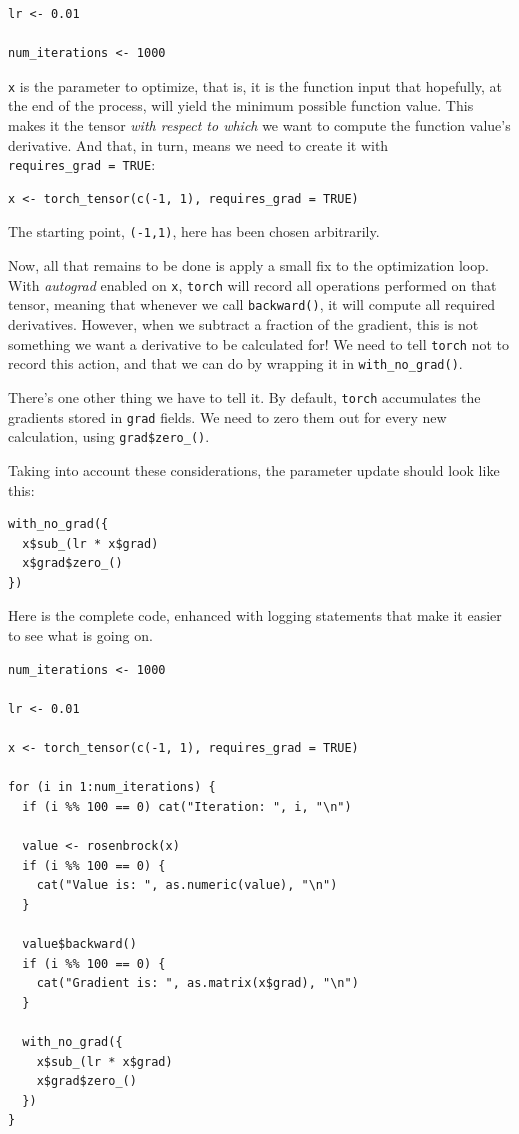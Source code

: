 \documentclass[
  letterpaper,
]{krantz}
\begin{document}
\begin{verbatim}
lr <- 0.01

num_iterations <- 1000
\end{verbatim}

\texttt{x} is the parameter to optimize, that is, it is the function
input that hopefully, at the end of the process, will yield the minimum
possible function value. This makes it the tensor \emph{with respect to
which} we want to compute the function value's derivative. And that, in
turn, means we need to create it with \texttt{requires\_grad\ =\ TRUE}:

\begin{verbatim}
x <- torch_tensor(c(-1, 1), requires_grad = TRUE)
\end{verbatim}

The starting point, \texttt{(-1,1)}, here has been chosen arbitrarily.

Now, all that remains to be done is apply a small fix to the
optimization loop. With \emph{autograd} enabled on \texttt{x},
\texttt{torch} will record all operations performed on that tensor,
meaning that whenever we call \texttt{backward()}, it will compute all
required derivatives. However, when we subtract a fraction of the
gradient, this is not something we want a derivative to be calculated
for! We need to tell \texttt{torch} not to record this action, and that
we can do by wrapping it in \texttt{with\_no\_grad()}.

There's one other thing we have to tell it. By default, \texttt{torch}
accumulates the gradients stored in \texttt{grad} fields. We need to
zero them out for every new calculation, using \texttt{grad\$zero\_()}.

Taking into account these considerations, the parameter update should
look like this:

\begin{verbatim}
with_no_grad({
  x$sub_(lr * x$grad)
  x$grad$zero_()
})
\end{verbatim}

Here is the complete code, enhanced with logging statements that make it
easier to see what is going on.

\begin{verbatim}
num_iterations <- 1000

lr <- 0.01

x <- torch_tensor(c(-1, 1), requires_grad = TRUE)

for (i in 1:num_iterations) {
  if (i %% 100 == 0) cat("Iteration: ", i, "\n")

  value <- rosenbrock(x)
  if (i %% 100 == 0) {
    cat("Value is: ", as.numeric(value), "\n")
  }

  value$backward()
  if (i %% 100 == 0) {
    cat("Gradient is: ", as.matrix(x$grad), "\n")
  }

  with_no_grad({
    x$sub_(lr * x$grad)
    x$grad$zero_()
  })
}
\end{verbatim}
\end{document}
